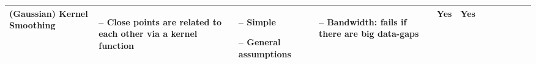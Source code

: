 \begin{table}[!ht]
\begin{tabular}{p{1.6cm}p{3.3cm}p{3.3cm}p{3.4cm}p{0.4cm}p{0.4cm}p{3cm}p{3cm}p{3cm}p{3cm}p{2.7cm}p{3cm}|}
		(Gaussian) Kernel Smoothing                                                                                                                                  &
		\begin{cptitemize} \item[--]  Close points are related to each other via a kernel function \end{cptitemize}                                                                                                                                                            &
		\begin{cptitemize} \item[--]  Simple \item[--]  General assumptions                                                                  \end{cptitemize}        &
		\begin{cptitemize} \item[--]  Bandwidth: fails if there are big data-gaps                                                     \end{cptitemize}               &
		Yes                                                                                                                                                          &
		Yes                                                                                                                                                            \\ \hline%



\end{tabular}
\end{table}
